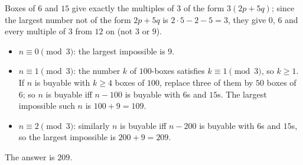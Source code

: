 Boxes of $6$ and $15$ give exactly the multiples of $3$ of the form $3(2p+5q)$; since the largest number not of the form $2p+5q$ is $2\cdot5-2-5=3$, they give $0$, $6$ and every multiple of $3$ from $12$ on (not $3$ or $9$).
\begin{itemize}
\item $n\equiv0\pmod3$: the largest impossible is $9$.
\item $n\equiv1\pmod3$: the number $k$ of $100$-boxes satisfies $k\equiv1\pmod3$, so $k\ge1$. If $n$ is buyable with $k\ge4$ boxes of $100$, replace three of them by $50$ boxes of $6$; so $n$ is buyable iff $n-100$ is buyable with $6$s and $15$s. The largest impossible such $n$ is $100+9=109$.
\item $n\equiv2\pmod3$: similarly $n$ is buyable iff $n-200$ is buyable with $6$s and $15$s, so the largest impossible is $200+9=209$.
\end{itemize}
The answer is $\boxed{209}$.
